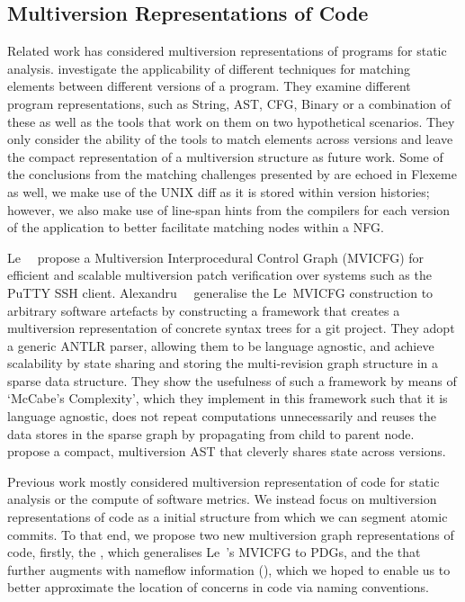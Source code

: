 \subsection{Multiversion Representations of Code}
\label{chapter:literature:sec:flexeme_rel_work:multiversion_repr}

Related work has considered multiversion representations of programs for static
analysis. \citet{kim2006program} investigate the applicability of different
techniques for matching elements between different versions of a program. They
examine different program representations, such as String, AST, CFG, Binary or a
combination of these as well as the tools that work on them on two hypothetical
scenarios. They only consider the ability of the tools to match elements across
versions and leave the compact representation of a multiversion structure as
future work. Some of the conclusions from the matching challenges presented by
\citet{kim2006program} are echoed in Flexeme as well, we make use of the UNIX
diff as it is stored within version histories; however, we also make use of
line-span hints from the compilers for each version of the application to better
facilitate matching nodes within a NFG.

Le~\etal~\cite{Le2014} propose a Multiversion Interprocedural Control Graph
(MVICFG) for efficient and scalable multiversion patch verification over systems
such as the PuTTY SSH client.
Alexandru~\etal~\citep{alexandru2019redundancy} generalise the Le~\etal MVICFG
construction to arbitrary software artefacts by constructing a framework that
creates a multiversion representation of concrete syntax trees for a git
project. They adopt a generic ANTLR parser, allowing them to be language
agnostic, and achieve scalability by state sharing and storing the
multi-revision graph structure in a sparse data structure. They show the
usefulness of such a framework by means of `McCabe’s Complexity', which they
implement in this framework such that it is language agnostic, does not repeat
computations unnecessarily and reuses the data stores in the sparse graph by
propagating from child to parent node. \citet{Sebastian2018} propose a compact,
multiversion AST that cleverly shares state across versions.

Previous work mostly considered multiversion representation of code for static
analysis or the compute of software metrics. We instead focus on multiversion
representations of code as a initial structure from which we can segment atomic
commits. To that end, we propose two new multiversion graph representations of
code, firstly, the \deltaPDG, which generalises Le~\etal's MVICFG to PDGs, and
the \deltaPDGN that further augments \deltaPDGNs with nameflow information
(), which we hoped to enable us to better approximate the
location of concerns in code via naming conventions.

